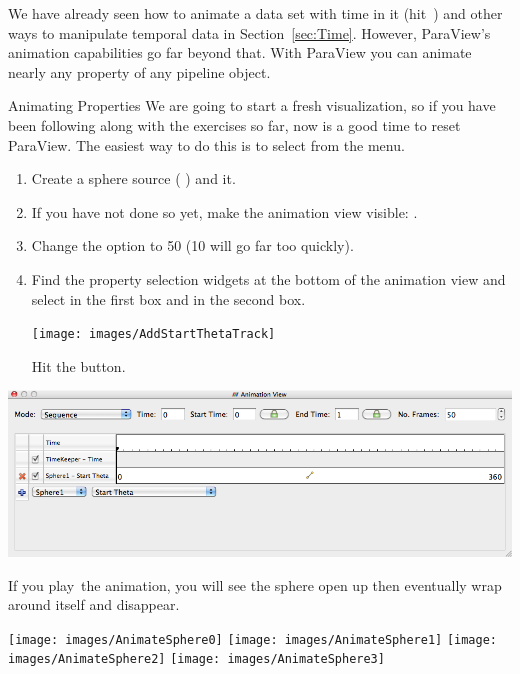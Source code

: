 We have already seen how to animate a data set with time in it
(hit~\vcrPlay) and other ways to manipulate temporal data in
Section~\ref{sec:Time}.  However, ParaView's animation capabilities go far
beyond that.  With ParaView you can animate nearly any property of any
pipeline object.

\begin{exercise}{Animating Properties}
  \label{ex:AnimatingProperties}%
  We are going to start a fresh visualization, so if you have been
  following along with the exercises so far, now is a good time to reset
  ParaView.  The easiest way to do this is to select  \ra
   from the menu.

  \begin{enumerate}
  \item Create a sphere source ( \ra {}) and \apply it.
  \item If you have not done so yet, make the animation view visible:
     \ra {}.
  \item Change the  option to 50 (10 will go far too quickly).
  \item Find the property selection widgets at the bottom of the animation
    view and select  in the first box and  in
    the second box.
    \begin{inlinefig}
      \texttt{[image: images/AddStartThetaTrack]}
    \end{inlinefig}
    Hit the  button.
  \end{enumerate}

  \begin{inlinefig}
    \includegraphics[width=.9\linewidth]{images/BuildAnimation1}
  \end{inlinefig}

  If you play~\vcrPlay the animation, you will see the sphere open up then
  eventually wrap around itself and disappear.

  \begin{inlinefig}
    \texttt{[image: images/AnimateSphere0]}
    \texttt{[image: images/AnimateSphere1]}
    \texttt{[image: images/AnimateSphere2]}
    \texttt{[image: images/AnimateSphere3]}
  \end{inlinefig}
\end{exercise}


